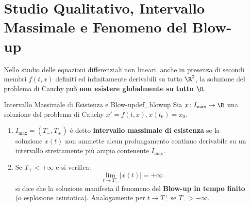 \section{Studio Qualitativo, Intervallo Massimale e Fenomeno del Blow-up}
\label{sec:blow_up_esempi}

Nello studio delle equazioni differenziali non lineari, anche in presenza di secondi membri $f(t, x)$ definiti ed infinitamente derivabili su tutto $\R^2$, la soluzione del problema di Cauchy può \textbf{non esistere globalmente su tutto $\R$}.

\begin{definizione}{Intervallo Massimale di Esistenza e Blow-up}{def_blowup}
Sia $x \colon I_{\text{max}} \to \R$ una soluzione del problema di Cauchy $x' = f(t, x), x(t_0) = x_0$.
\begin{enumerate}
    \item $I_{\text{max}} = (T_-, T_+)$ è detto \textbf{intervallo massimale di esistenza} se la soluzione $x(t)$ non ammette alcun prolungamento continuo derivabile su un intervallo strettamente più ampio contenente $I_{\text{max}}$.
    \item Se $T_+ < +\infty$ e si verifica:
    \begin{equation}
        \lim_{t \to T_+^-} |x(t)| = +\infty
    \end{equation}
    si dice che la soluzione manifesta il fenomeno del \textbf{Blow-up in tempo finito} (o esplosione asintotica). Analogamente per $t \to T_-^+$ se $T_- > -\infty$.
\end{enumerate}
\end{definizione}

